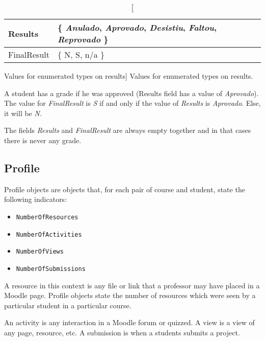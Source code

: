 \begin{table}[h!]
    \centering

    \begin{tabular}{| l | l |}
        \hline
        Results & \{ \textit{Anulado},
                     \textit{Aprovado},
                     \textit{Desistiu},
                     \textit{Faltou},
                     \textit{Reprovado}
                  \} \\ \hline
        FinalResult & \{ N, S, n/a \}  \\ \hline
    \end{tabular}

    \caption
        [Values for enumerated types on results]
        {Values for enumerated types on results.}

    \label{tab:results_fetures_enum}
\end{table}

A student has a grade if he was approved (Results field has a value of
\textit{Aprovado}). The value for \textit{FinalResult} is \textit{S} if and
only if the value of \textit{Results} is \textit{Aprovado}. Else, it will be
\textit{N}.

The fields \textit{Results} and \textit{FinalResult} are always empty together
and in that cases there is never any grade.

\subsection{Profile}
\label{sec:profile}

Profile objects are objects that, for each pair of course and student, state
the following indicators:

\begin{itemize}
    \item \texttt{NumberOfResources}
    \item \texttt{NumberOfActivities}
    \item \texttt{NumberOfViews}
    \item \texttt{NumberOfSubmissions}
\end{itemize}

A resource in this context is any file or link that a professor may have placed
in a Moodle page. Profile objects state the number of resources which were seen
by a particular student in a particular course.

An activity is any interaction in a Moodle forum or quizzed. A view is a view
of any page, resource, etc. A submission is when a students submits a project.

